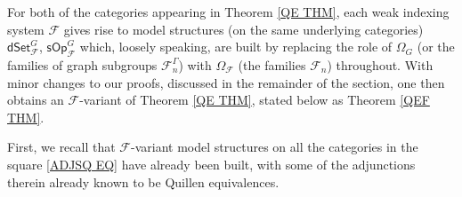 \documentclass[a4paper,10pt
,draft
]{article}%
\numberwithin{equation}{section}
\numberwithin{figure}{section}
\theoremstyle{definition} %
\newcommand{\F}{\ensuremath{\mathcal F}}
\newcommand{\1}{\ensuremath{\mathbbm 1}}%
\begin{document}
For both of the categories appearing in Theorem \ref{QE THM},
each weak indexing system $\F$
gives rise to model structures (on the same underlying categories)
$\mathsf{dSet}^G_{\F}$, 
$\mathsf{sOp}^G_{\F}$
which, loosely speaking, are built by replacing the role
of $\Omega_G$ (or the families of graph subgroups $\F^{\Gamma}_n$)
with $\Omega_\F$ (the families $\F_n$) throughout.
With minor changes to our proofs, discussed in the remainder of the section, one then obtains an $\F$-variant of Theorem \ref{QE THM},
stated below as Theorem \ref{QEF THM}. 

First, we recall that $\F$-variant model structures on 
all the categories in the square \eqref{ADJSQ EQ}
have already been built,
with some of the adjunctions therein already known to be Quillen equivalences.
\end{document}
